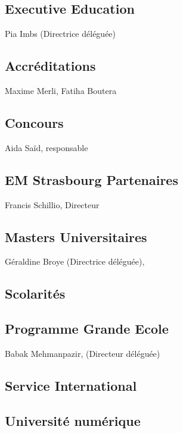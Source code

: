 \documentclass{book}
\begin{document}
\subsection{Executive Education }
Pia Imbs (Directrice déléguée)

\subsection{Accréditations}
Maxime Merli, Fatiha Boutera

\subsection{Concours }
Aida Saïd, responsable

\subsection{EM Strasbourg Partenaires }
Francis Schillio, Directeur 

\subsection{Masters Universitaires}
Géraldine Broye (Directrice déléguée),

 
\subsection{Scolarités}

\subsection{Programme Grande Ecole}
Babak Mehmanpazir, (Directeur déléguée)

\subsection{Service International}

\subsection{Université numérique}



\appendix
%
\printindex
\end{document}
